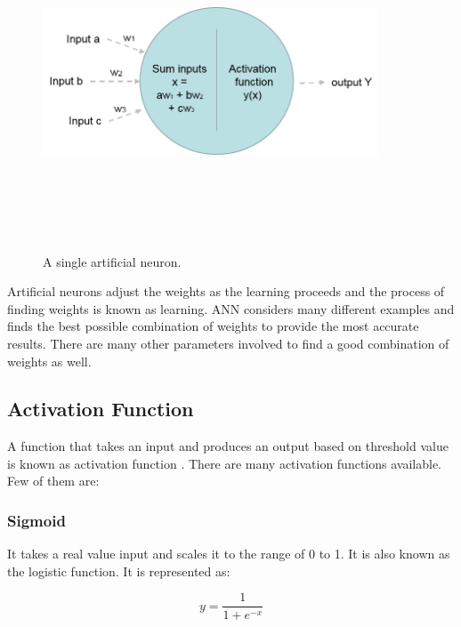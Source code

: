 \begin{figure}[htpb]
	\centering
	\includegraphics[width=10cm,height=10cm,keepaspectratio=true]{images/single-neuron}
	\caption{
		A single artificial neuron.
	}
	\label{fig:single-neuron}
\end{figure}

Artificial neurons adjust the weights as the learning proceeds and the process of finding weights is known as learning. ANN considers many different examples and finds the best possible combination of weights to provide the most accurate results. There are many other parameters involved to find a good combination of weights as well.

\subsection{Activation Function}

A function that takes an input and produces an output based on threshold value is known as activation function \cite{ujjwalkarn}. There are many activation functions available. Few of them are:

\subsubsection{Sigmoid}
It takes a real value input and scales it to the range of 0 to 1. It is also known as the logistic function. It is represented as:

\begin{equation} 
y = \frac{1}{1 + e^{-x}}
\end{equation}


